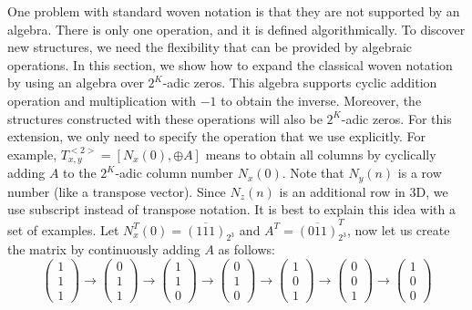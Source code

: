 \documentclass[times,twocolumn,final]{elsarticle}
\begin{document}
One problem with standard woven notation is that they are not supported by an algebra. There is only one operation, and it is defined algorithmically. 
To discover new structures, we need the flexibility that can be provided by algebraic operations. In this section, we show how to expand the classical woven notation by using an algebra over $2^K$-adic zeros. This algebra supports cyclic addition operation and multiplication with $-1$ to obtain the inverse. 
Moreover, the structures constructed with these operations will also be $2^K$-adic zeros. For this extension, we only need to specify the operation that we use explicitly. For example, 
$ T_{x,y}^{<2>} = [N_x(0), \oplus A]$ means to obtain all columns by cyclically adding $A$ to the $2^K$-adic column number $N_x(0)$. Note that $N_y(n)$ is a row number (like a transpose vector). Since $N_z(n)$ is an additional row in 3D, we use subscript instead of transpose notation. It is best to explain this idea with a set of examples. Let $N^T_x(0) = \overline{(111)}_{2^3}$ and $A^T=\overline{(011)}^T_{2^3}$, now let us create the matrix by continuously adding $A$ as follows:
$$ 
\begin{pmatrix}1\\1\\1\end{pmatrix} \rightarrow 
\begin{pmatrix}0\\1\\1\end{pmatrix} \rightarrow 
\begin{pmatrix}1\\1\\0\end{pmatrix} \rightarrow 
\begin{pmatrix}0\\1\\0\end{pmatrix} \rightarrow 
\begin{pmatrix}1\\0\\1\end{pmatrix} \rightarrow 
\begin{pmatrix}0\\0\\1\end{pmatrix} \rightarrow 
\begin{pmatrix}1\\0\\0\end{pmatrix} 
$$
\end{document}
